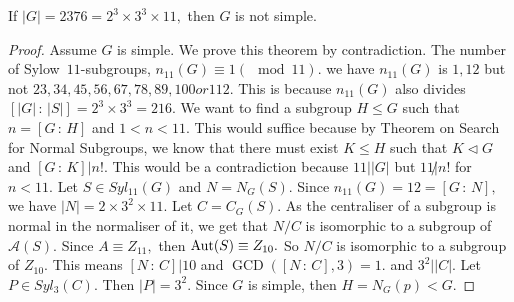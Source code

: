\begin{example}
	If $ \lvert G \rvert = 2376 = 2^3 \times 3^3 \times 11,$ then $G$ is not simple.
\end{example}
\begin{proof}
	Assume $G$ is simple. We prove this theorem by contradiction.
	The number of Sylow~$11$\nobreakdash-subgroups, $n_{11}(G) \equiv 1 (\mod 11).$
	we have $n_{11}(G)$ is $1, 12 $ but not $23, 34, 45, 56, 67, 78, 89, 100 or 112.$
	This is because $n_{11}(G) $ also divides $ \left[ \lvert G \rvert \, :
	\, \lvert S \rvert\right] = 2^3 \times 3^3 = 216.$
	We want to find a subgroup $H \leq G$ such that $n = \left[ G \, : \, H \right] $
	and $1 < n < 11.$ This would suffice because by Theorem on Search for Normal Subgroups, we know that there
	must exist $ K \leq H $  such that $K \triangleleft G$ and 
	$\left[ G \, : \, K \right] | n!.$ This would be a contradiction because 
	$11 | \lvert G \rvert$ but $ 11 \not | n!$ for $n < 11.$
	Let $S \in Syl_{11}(G) $ and $N = N_G(S).$ Since $n_{11}(G) = 12 = 
	\left[ G \, : \, N \right] ,$ we have $ \lvert N \rvert = 2 \times 3^2 \times 11.$
	Let $C = C_G(S).$ As the centraliser of a subgroup is normal in the normaliser of
	it, we get that $N / C $ is isomorphic to a subgroup of $\mathcal{A}(S).$
	Since $A \equiv Z _{11},$ then $\operatorname{Aut}(S) \equiv Z _{10}.$ So $N/C$ is 
	isomorphic to a subgroup of $Z _{10} .$ This means $ \left[ N \, : \, C \right] 
	| 10 $ and $\operatorname{GCD}( \left[ N \, : \, C \right] , 3) = 1. $
	and $3^2 | \lvert C \rvert.$
	Let $P \in Syl_3(C).$ Then $ \lvert P \rvert = 3^2.$ Since $G$ is simple, then
	$H = N_G(p) < G.$
\end{proof}
